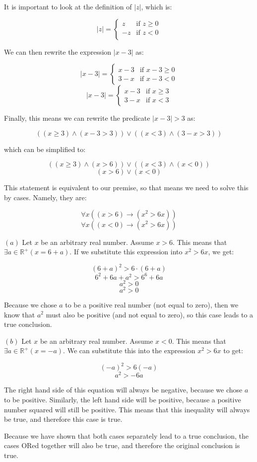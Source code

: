 \documentclass{article}
\newcommand{\subproblem}[1]{$\boxed{(#1)}$}
\begin{document}
\begin{multicols*}{2}
It is important to look at the definition of $|z|$, which is:

\[
|z|=\begin{cases}z & \text{if $z\ge{}0$} \\
-z & \text{if $z<0$} \\
\end{cases}
\]

We can then rewrite the expression $|x-3|$ as:

\[
|x-3|=\begin{cases}x-3 & \text{if $x-3\ge 0$} \\
3-x & \text{if $x-3<0$}
\end{cases}
\] \[
|x-3|=\begin{cases}x-3 & \text{if $x\ge 3$} \\
3-x & \text{if $x<3$}
\end{cases}
\]

Finally, this means we can rewrite the predicate $|x-3|>3$ as:

\[
((x\ge 3)\wedge(x-3>3))\vee((x<3)\wedge(3-x>3))
\]

which can be simplified to:

\[
((x\ge 3)\wedge(x>6))\vee((x<3)\wedge(x<0))
\] \[
(x>6)\vee(x<0)
\]

This statement is equivalent to our premise, so that means we need to
solve this by cases. Namely, they are:

\[\tag{a}
\forall x((x>6)\rightarrow(x^2>6x))
\] \[\tag{b}
\forall x((x<0)\rightarrow(x^2>6x))
\]

\subproblem{a} Let $x$ be an arbitrary real number. Assume $x>6$. This
means that $\exists{}a\in\mathbb{R}^+(x=6+a)$. If we substitute this
expression into $x^2>6x$, we get:

\[
(6+a)^2>6\cdot(6+a)
\] \[
6^2+6a+a^2>6^6+6a
\] \[
a^2>0
\] \[
a^2>0
\]

Because we chose $a$ to be a positive real number (not equal to zero),
then we know that $a^2$ must also be positive (and not equal to zero),
so this case leads to a true conclusion.

\subproblem{b} Let $x$ be an arbitrary real number. Assume $x<0$. This
means that $\exists{}a\in\mathbb{R}^+(x=-a)$. We can substitute this
into the expression $x^2>6x$ to get:

\[
(-a)^2>6(-a)
\] \[
a^2>-6a
\]

The right hand side of this equation will always be negative, because
we chose $a$ to be positive. Similarly, the left hand side will be
positive, because a positive number squared will still be
positive. This means that this inequality will always be true, and
therefore this case is true.

Because we have shown that both cases separately lead to a true
conclusion, the cases ORed together will also be true, and therefore
the original conclusion is true.

\end{multicols*}
\end{document}
